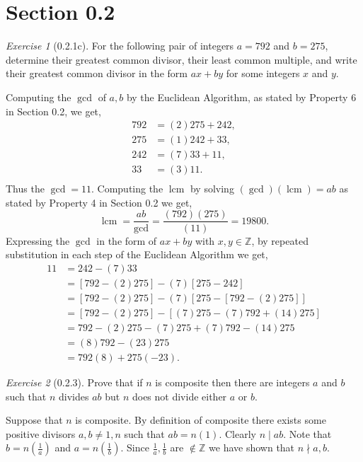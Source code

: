 \documentclass[12pt]{amsart}
\makeatletter
\theoremstyle{remark}
\newtheorem*{exercise}{Exercise}%
\def\ZZ{\ensuremath{\mathbb Z}}
\renewenvironment{proof}[1][\proofname]{\par\doublespacing
  \pushQED{\qed}%
  \normalfont \topsep6\p@\@plus6\p@\relax
  \list{}{%
    \settowidth{\leftmargin}{\itshape\proofname:\hskip\labelsep}%
    \setlength{\labelwidth}{0pt}%
    \setlength{\itemindent}{-\leftmargin}%
  }%
  \item[\hskip\labelsep\itshape#1\@addpunct{:}]\ignorespaces
}{%
  \popQED\endlist\@endpefalse
  \singlespacing
}
\theoremstyle{mycomment}
\DeclareMathOperator{\lcm}{lcm}
\makeatother
\begin{document}
\thispagestyle{fancy}
\author{Coordinator: Coordinator's Name}

\section*{\textbf{Section 0.2}}

\begin{exercise}[0.2.1c] For the following pair of integers $a = 792$ and $b = 275$, 
  determine their greatest common divisor, their least common multiple, and 
  write their greatest common divisor in the form $ax+by$ for some integers $x$ and $y$.
\begin{proof}[Solution:]
  Computing the $\gcd$ of $a,b$ by the Euclidean Algorithm, as stated by Property 6 in Section 0.2, we get,  
  \begin{align*}
    792 &= (2)275 + 242,\\
    275 &= (1)242 + 33,\\
    242 &= (7)33 + 11,\\
    33 &= (3)11.\\
  \end{align*}
  Thus the $\gcd = 11$. Computing the $\lcm$ by solving $(\gcd)(\lcm) = ab$ as stated by Property 4 in Section 0.2 we get, 
  \begin{equation*}
    \lcm = \dfrac{ab}{\gcd} = \dfrac{(792)(275)}{(11)} = 19800.
  \end{equation*}
  Expressing the $\gcd$ in the form of $ax+by$ with $x,y \in \ZZ$, by repeated substitution in each step of the Euclidean Algorithm we get, 
  \begin{align*}
    11 &= 242 - (7)33\\
     &= [792 - (2)275] - (7)[275 - 242]\\
     &= [792 - (2)275] - (7)[275 - [792 - (2)275]]\\
     &= [792 - (2)275] - [(7)275 - (7)792 + (14)275]\\
     &= 792 - (2)275 - (7)275 + (7)792 -(14)275\\
     &= (8)792 - (23)275\\
     &= 792(8) + 275(-23).
  \end{align*}
\end{proof}
\end{exercise}


\begin{exercise}[0.2.3] Prove that if $n$ is composite then there are integers $a$ and $b$ such that $n$ divides $ab$ but $n$ does not divide either $a$ or $b$.
\begin{proof} Suppose that $n$ is composite. By definition of composite there exists some positive divisors $a,b \neq 1, n$ such that $ab = n(1)$.
  Clearly $n \mid ab$. Note that $b = n(\frac{1}{a})$ and $a = n(\frac{1}{b})$.
  Since $\frac{1}{a}, \frac{1}{b}$ are $\notin \ZZ$ we have shown that $n \nmid a,b$.
\end{proof}
\end{exercise}
\end{document}
